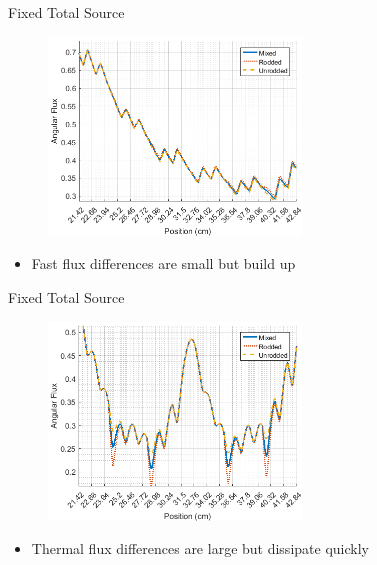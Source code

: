 
\begin{frame}[t]{Fixed Total Source}

\begin{figure}[H]
    \centering
    \includegraphics[width=0.6\textwidth]{../figs/1dmoc-50mix-fixedscat-angflux1.png}
\end{figure}
\begin{itemize}
  \item Fast flux differences are small but build up
\end{itemize}

\end{frame}


\begin{frame}[t]{Fixed Total Source}

\begin{figure}[H]
  \centering
  \includegraphics[width=0.6\textwidth]{../figs/1dmoc-50mix-fixedscat-angflux7.png}
\end{figure}
\begin{itemize}
  \item Thermal flux differences are large but dissipate quickly
\end{itemize}

\end{frame}


